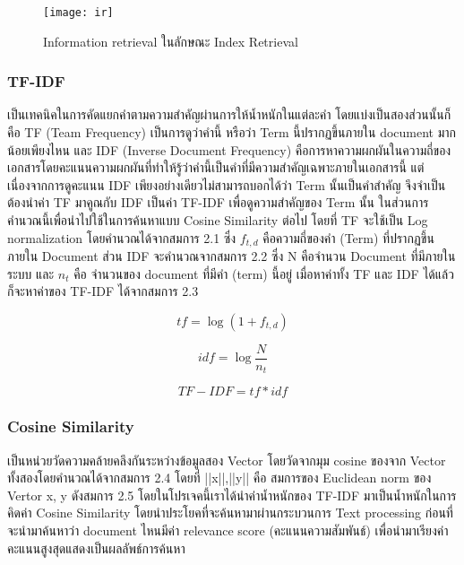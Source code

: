     \begin{figure}[H]
        \centering
        \texttt{[image: ir]}
        \caption{Information retrieval ในลักษณะ Index Retrieval}\label{fig:ir}
    \end{figure}

\subsubsection{TF-IDF}

เป็นเทคนิคในการคัดแยกคำตามความสำคัญผ่านการให้น้ำหนักในแต่ละคำ โดยแบ่งเป็นสองส่วนนั้นก็คือ TF (Team Frequency) เป็นการดูว่าคำนี้ หรือว่า Term นี้ปรากฏขึ้นภายใน document มากน้อยเพียงไหน และ IDF (Inverse  Document Frequency) คือการหาความผกผันในความถี่ของเอกสารโดยคะแนนความผกผันที่ทำให้รู้ว่าคำนี้เป็นคำที่มีความสำคัญเฉพาะภายในเอกสารนี้ แต่เนื่องจากการดูคะแนน IDF เพียงอย่างเดียวไม่สามารถบอกได้ว่า Term นั้นเป็นคำสำคัญ จึงจำเป็นต้องนำค่า TF มาคูณกับ IDF เป็นค่า TF-IDF เพื่อดูความสำคัญของ Term นั้น ในส่วนการคำนวณนี้เพื่อนำไปใช้ในการค้นหาแบบ Cosine Similarity ต่อไป โดยที่ TF จะใช้เป็น Log normalization โดยคำนวณได้จากสมการ 2.1 ซึ่ง $f_{t,d}$ คือความถี่ของคำ (Term) ที่ปรากฏขึ้นภายใน Document ส่วน IDF จะคำนวณจากสมการ 2.2 ซึ่ง N คือจำนวน Document ที่มีภายในระบบ และ $n_{t}$ คือ จำนวนของ document ที่มีคำ (term) นี้อยู่ เมื่อหาค่าทั้ง TF และ IDF ได้แล้วก็จะหาค่าของ TF-IDF ได้จากสมการ 2.3

\begin{equation}
    tf=\log{(1+f_{t,d})}
    \end{equation}

\begin{equation}
    idf=\log{\frac{N}{n_{t}}}
\end{equation}

\begin{equation}
    TF-IDF=tf*idf
    \end{equation}    

\subsubsection{Cosine Similarity}

เป็นหน่วยวัดความคล้ายคลึงกันระหว่างข้อมูลสอง Vector โดยวัดจากมุม cosine ของจาก Vector ทั้งสองโดยคำนวณได้จากสมการ 2.4 โดยที่ ||x||,||y|| คือ สมการของ Euclidean norm ของ Vertor x, y ดังสมการ 2.5 โดยในโปรเจคนี้เราได้นำค่าน้ำหนักของ TF-IDF มาเป็นน้ำหนักในการคิดค่า Cosine Similarity โดยนำประโยคที่จะค้นหามาผ่านกระบวนการ Text processing ก่อนที่จะนำมาค้นหาว่า document ไหนมีค่า relevance score (คะแนนความสัมพันธ์) เพื่อนำมาเรียงค่าคะแนนสูงสุดแสดงเป็นผลลัพธ์การค้นหา


